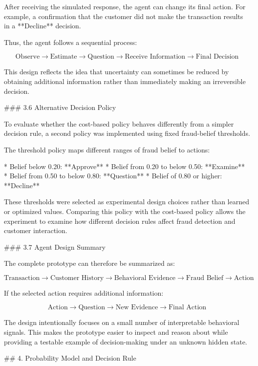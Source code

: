 After receiving the simulated response, the agent can change its final action. For example, a confirmation that the customer did not make the transaction results in a **Decline** decision.

Thus, the agent follows a sequential process:

$$
\text{Observe}
\rightarrow
\text{Estimate}
\rightarrow
\text{Question}
\rightarrow
\text{Receive Information}
\rightarrow
\text{Final Decision}
$$

This design reflects the idea that uncertainty can sometimes be reduced by obtaining additional information rather than immediately making an irreversible decision.

### 3.6 Alternative Decision Policy

To evaluate whether the cost-based policy behaves differently from a simpler decision rule, a second policy was implemented using fixed fraud-belief thresholds.

The threshold policy maps different ranges of fraud belief to actions:

* Belief below 0.20: **Approve**
* Belief from 0.20 to below 0.50: **Examine**
* Belief from 0.50 to below 0.80: **Question**
* Belief of 0.80 or higher: **Decline**

These thresholds were selected as experimental design choices rather than learned or optimized values. Comparing this policy with the cost-based policy allows the experiment to examine how different decision rules affect fraud detection and customer interaction.

### 3.7 Agent Design Summary

The complete prototype can therefore be summarized as:

$$
\boxed{
\text{Transaction}
\rightarrow
\text{Customer History}
\rightarrow
\text{Behavioral Evidence}
\rightarrow
\text{Fraud Belief}
\rightarrow
\text{Action}
}
$$

If the selected action requires additional information:

$$
\boxed{
\text{Action}
\rightarrow
\text{Question}
\rightarrow
\text{New Evidence}
\rightarrow
\text{Final Action}
}
$$

The design intentionally focuses on a small number of interpretable behavioral signals. This makes the prototype easier to inspect and reason about while providing a testable example of decision-making under an unknown hidden state.

## 4. Probability Model and Decision Rule

